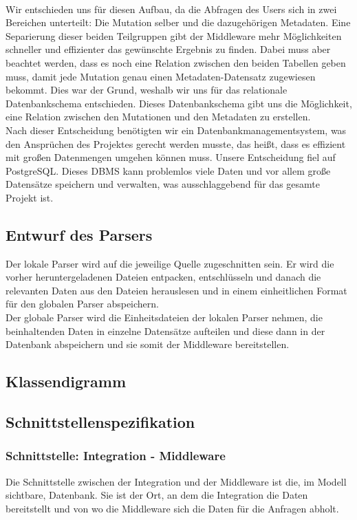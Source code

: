 \\
Wir entschieden uns für diesen Aufbau, da die Abfragen des Users sich in zwei Bereichen unterteilt: Die Mutation selber und die dazugehörigen Metadaten. Eine Separierung dieser beiden Teilgruppen gibt der Middleware mehr Möglichkeiten schneller und effizienter das gewünschte Ergebnis zu finden. Dabei muss aber beachtet werden, dass es noch eine Relation zwischen den beiden Tabellen geben muss, damit jede Mutation genau einen Metadaten-Datensatz zugewiesen bekommt. Dies war der Grund, weshalb wir uns für das relationale Datenbankschema entschieden. Dieses Datenbankschema gibt uns die Möglichkeit, eine Relation zwischen den Mutationen und den Metadaten zu erstellen.\\
Nach dieser Entscheidung benötigten wir ein Datenbankmanagementsystem, was den Ansprüchen des Projektes gerecht werden musste, das heißt, dass es effizient mit großen Datenmengen umgehen können muss. Unsere Entscheidung fiel auf PostgreSQL. Dieses DBMS kann problemlos viele Daten und vor allem große Datensätze speichern und verwalten, was ausschlaggebend für das gesamte Projekt ist.
\subsection{Entwurf des Parsers}
Der lokale Parser wird auf die jeweilige Quelle zugeschnitten sein. Er wird die vorher heruntergeladenen Dateien entpacken, entschlüsseln und danach die relevanten Daten aus den Dateien herauslesen und in einem einheitlichen Format für den globalen Parser abspeichern.\\
Der globale Parser wird die Einheitsdateien der lokalen Parser nehmen, die beinhaltenden Daten in einzelne Datensätze aufteilen und diese dann in der Datenbank abspeichern und sie somit der Middleware bereitstellen.
\subsection{Klassendigramm}
\subsection{Schnittstellenspezifikation}
\subsubsection{Schnittstelle: Integration - Middleware}
Die Schnittstelle zwischen der Integration und der Middleware ist die, im Modell sichtbare, Datenbank. Sie ist der Ort, an dem die Integration die Daten bereitstellt und von wo die Middleware sich die Daten für die Anfragen abholt.
